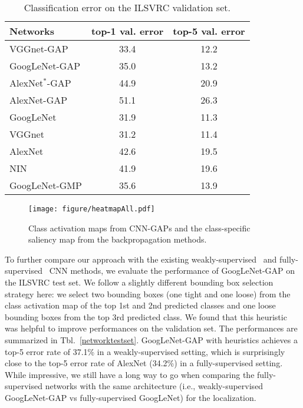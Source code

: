 \documentclass[10pt,twocolumn,letterpaper]{article}
\begin{document}
\begin{table}\caption{Classification error on the ILSVRC validation set.}
\label{network_classificationValidation}
\centering
\footnotesize
\begin{tabular}{ l | c | c }
  \hline  
  \hline                       
  Networks & top-1 val. error & top-5 val. error \\
    \hline   
VGGnet-GAP& 33.4 & 12.2 \\
GoogLeNet-GAP& 35.0 & 13.2 \\
AlexNet$^{*}$-GAP & 44.9 & 20.9 \\
AlexNet-GAP & 51.1 & 26.3 \\
\hline
  GoogLeNet & 31.9 & 11.3 \\ 
  VGGnet & 31.2 &  11.4 \\    
  AlexNet &  42.6 &  19.5  \\
    NIN & 41.9 & 19.6 \\
    \hline 
    GoogLeNet-GMP & 35.6 & 13.9 \\    
    \hline
\end{tabular}
\end{table}

\begin{figure*}
\begin{center}
\texttt{[image: figure/heatmapAll.pdf]}
\end{center}
\vspace{-4mm}
\caption{Class activation maps from CNN-GAPs and the class-specific saliency map from the backpropagation methods.}
\label{fig:activationmap}
\end{figure*}









To further compare our approach with the existing weakly-supervised~\cite{simonyan2013deep} and fully-supervised~\cite{szegedy2014going,sermanet2013overfeat,szegedy2014going} CNN methods, we evaluate the performance of GoogLeNet-GAP on the ILSVRC test set. We follow a slightly different bounding box selection strategy here: we select two bounding boxes (one tight and one loose) from the class activation map of the top 1st and 2nd predicted classes and one loose bounding boxes from the top 3rd predicted class. We found that this heuristic was helpful to improve performances on the validation set. The performances are summarized in Tbl.~\ref{networktestset}. GoogLeNet-GAP with heuristics achieves a top-5 error rate of 37.1\% in a weakly-supervised setting, which is surprisingly close to the top-5 error rate of AlexNet (34.2\%) in a fully-supervised setting. While impressive, we still have a long way to go when comparing the fully-supervised networks with the same architecture (i.e., weakly-supervised GoogLeNet-GAP vs fully-supervised GoogLeNet) for the localization.
\end{document}

